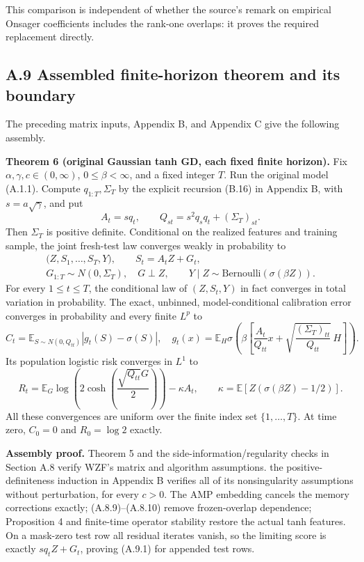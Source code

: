 \documentclass[
  11pt,
  a4paper,
]{article}
\begin{document}
This comparison is independent of whether the source's remark on
empirical Onsager coefficients includes the rank-one overlaps: it proves
the required replacement directly.

\hypertarget{a.9-assembled-finite-horizon-theorem-and-its-boundary}{%
\subsection{A.9 Assembled finite-horizon theorem and its
boundary}\label{a.9-assembled-finite-horizon-theorem-and-its-boundary}}

The preceding matrix inputs, Appendix B, and Appendix C give the
following assembly.

\textbf{Theorem 6 (original Gaussian tanh GD, each fixed finite
horizon).} Fix \(\alpha,\gamma,c\in(0,\infty)\), \(0\le\beta<\infty\),
and a fixed integer \(T\). Run the original model (A.1.1). Compute
\(q_{1:T},\Sigma_T\) by the explicit recursion (B.16) in Appendix B,
with \(s=a\sqrt\gamma\), and put \[
A_t=sq_t,\qquad Q_{st}=s^2q_sq_t+(\Sigma_T)_{st}.
\] Then \(\Sigma_T\) is positive definite. Conditional on the realized
features and training sample, the joint fresh-test law converges weakly
in probability to \[
\begin{gathered}
\bigl(Z,S_1,\ldots,S_T,Y\bigr),\qquad S_t=A_tZ+G_t,\\
G_{1:T}\sim N(0,\Sigma_T),\quad G\perp Z,\qquad
Y\mid Z\sim\mathrm{Bernoulli}(\sigma(\beta Z)).
\end{gathered}
\tag{A.9.1}
\] For every \(1\le t\le T\), the conditional law of \((Z,S_t,Y)\) in
fact converges in total variation in probability. The exact, unbinned,
model-conditional calibration error converges in probability and every
finite \(L^p\) to \[
C_t=\mathbb E_{S\sim N(0,Q_{tt})}|g_t(S)-\sigma(S)|,
\quad
 g_t(x)=\mathbb E_H\sigma\!\left(\beta\left[\frac{A_t}{Q_{tt}}x+
 \sqrt{\frac{(\Sigma_T)_{tt}}{Q_{tt}}}\,H\right]\right).
\tag{A.9.2}
\] Its population logistic risk converges in \(L^1\) to \[
R_t=\mathbb E_G\log\left(2\cosh\left(\frac{\sqrt{Q_{tt}}G}{2}\right)\right)-\kappa A_t,
\qquad
\kappa=\mathbb E[Z(\sigma(\beta Z)-1/2)].
\tag{A.9.3}
\] All these convergences are uniform over the finite index set
\(\{1,\ldots,T\}\). At time zero, \(C_0=0\) and \(R_0=\log2\) exactly.

\textbf{Assembly proof.} Theorem 5 and the side-information/regularity
checks in Section A.8 verify WZF's matrix and algorithm assumptions. the
positive-definiteness induction in Appendix B verifies all of its
nonsingularity assumptions without perturbation, for every \(c>0\). The
AMP embedding cancels the memory corrections exactly; (A.8.9)--(A.8.10)
remove frozen-overlap dependence; Proposition 4 and finite-time operator
stability restore the actual tanh features. On a mask-zero test row all
residual iterates vanish, so the limiting score is exactly
\(sq_tZ+G_t\), proving (A.9.1) for appended test rows.
\end{document}
